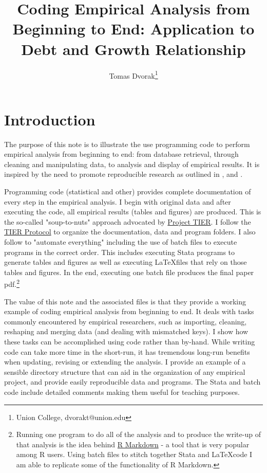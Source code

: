 \documentclass[letterpaper,11pt]{article}
\begin{document}
\title{\vspace{-1in} Coding Empirical Analysis from Beginning to End: Application to Debt and Growth Relationship}
\author{Tomas Dvorak\thanks{Union College, dvorakt@union.edu}}

\maketitle


\section{Introduction}

The purpose of this note is to illustrate the use programming code to perform empirical analysis from beginning to end: from database retrieval, through cleaning and manipulating data, to analysis and display of empirical results. It is inspired by the need to promote reproducible research as outlined in \cite{ball2012teaching}, \cite{gentzkow2014code} and \cite{hoffler2017replication}. 

Programming code (statistical and other) provides complete documentation of every step in the empirical analysis. I begin with original data and after executing the code, all empirical results (tables and figures) are produced. This is the so-called "soup-to-nuts" approach advocated by \href{http://www.projecttier.org/}{Project TIER}. I follow the \href{http://www.projecttier.org/tier-protocol/}{TIER Protocol} to organize the documentation, data and program folders. I also follow \cite{gentzkow2014code} to "automate everything" including the use of batch files to execute programs in the correct order. This includes executing Stata programs to generate tables and figures as well as executing \LaTeX files that rely on those tables and figures. In the end, executing one batch file produces the final paper pdf.\footnote{Running one program to do all of the analysis and to produce the write-up of that analysis is the idea behind \href{http://rmarkdown.rstudio.com/}{R Markdown} - a tool that is very popular among R users. Using batch files to stitch together Stata and \LaTeX code I am able to replicate some of the functionality of R Markdown.}

The value of this note and the associated files is that they provide a working example of coding empirical analysis from beginning to end. It deals with tasks commonly encountered by empirical researchers, such as importing, cleaning, reshaping and merging data (and dealing with mismatched keys). I show how these tasks can be accomplished using code rather than by-hand. While writing code can take more time in the short-run, it has tremendous long-run benefits when updating, revising or extending the analysis. I provide an example of a sensible directory structure that can aid in the organization of any empirical project, and provide easily reproducible data and programs. The Stata and batch code include detailed comments making them useful for teaching purposes. 
 
\end{document}
